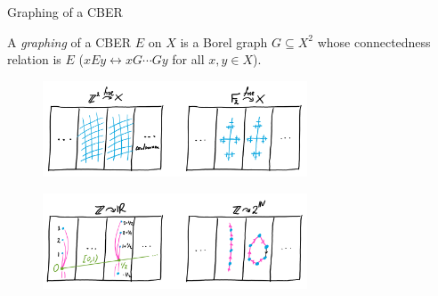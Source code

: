 \documentclass{beamer}
\begin{document}
    \begin{frame}{Graphing of a CBER}
        \begin{definition}
            A \textit{graphing} of a CBER $E$ on $X$ is a Borel graph $G\subseteq X^2$ whose connectedness relation is $E$ ($xEy\leftrightarrow xG\cdots Gy$ for all $x,y\in X$).
        \end{definition}

        \pause
        \vspace{-0.15in}

        \begin{figure}[h]
            \center
            \includegraphics[width=0.7\textwidth]{img/group_action.png}
        \end{figure}
        \vspace{-0.2in}
        \begin{figure}[h]
            \center
            \includegraphics[width=0.7\textwidth]{img/smooth_hyperfinite.png}
        \end{figure}
    \end{frame}
\end{document}
